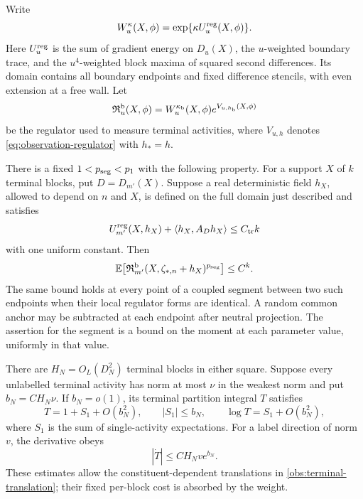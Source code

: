 \begin{lemma}\label{obs:terminal-family}
Write
\[
 W_u^\kappa(X,\phi)=\exp\{\kappa U_u^{\rm reg}(X,\phi)\}.
\]
Here \(U_u^{\rm reg}\) is the sum of gradient energy on \(D_u(X)\),
the \(u\)-weighted boundary trace, and the \(u^4\)-weighted block
maxima of squared second differences.  Its domain contains all
boundary endpoints and fixed difference stencils, with even extension
at a free wall.  Let
\[
 \mathfrak R_u^{\rm b}(X,\phi)
       =W_u^{\kappa_{\rm b}}(X,\phi)e^{V_{u,h_{\rm b}}(X,\phi)}
\]
be the regulator used to measure terminal activities, where
\(V_{u,h}\) denotes \eqref{eq:observation-regulator} with \(h_*=h\).

There is a fixed \(1<p_{\rm seg}<p_1\) with the following property.
For a support \(X\) of \(k\) terminal blocks, put \(D=D_{m'}(X)\).
Suppose a real deterministic field \(h_X\), allowed to depend on
\(n\) and \(X\), is defined on the full domain just described and
satisfies
\begin{equation}\label{obs:terminal-translation}
 U_{m'}^{\rm reg}(X,h_X)+\langle h_X,A_Dh_X\rangle\le C_{\rm tr}k
\end{equation}
with one uniform constant.  Then
\begin{equation}\label{obs:terminal-moment}
 \mathbb E\bigl[\mathfrak R_{m'}^{\rm b}
                 (X,\zeta_{*,n}+h_X)^{p_{\rm seg}}\bigr]\le C^k.
\end{equation}
The same bound holds at every point of a coupled segment between
two such endpoints when their local regulator forms are identical.
A random common anchor may be subtracted at each endpoint after
neutral projection.  The assertion for the segment is a bound on
the moment at each parameter value, uniformly in that value.

There are \(H_N=O_L(D_N^2)\) terminal blocks in either square.
Suppose every unlabelled terminal activity has norm at most \(\nu\)
in the weakest norm and put \(b_N=CH_N\nu\).  If \(b_N=o(1)\), its
terminal partition integral \(T\) satisfies
\begin{equation}\label{obs:terminal-expansion}
 T=1+S_1+O(b_N^2),\qquad |S_1|\le b_N,\qquad
                  \log T=S_1+O(b_N^2),
\end{equation}
where \(S_1\) is the sum of single-activity expectations.
For a label direction of norm \(v\), the derivative obeys
\begin{equation}\label{obs:terminal-derivative}
                         |\dot T|\le CH_Nv e^{b_N}.
\end{equation}
These estimates allow the constituent-dependent translations in
\eqref{obs:terminal-translation}; their fixed per-block cost is
absorbed by the weight.
\end{lemma}

